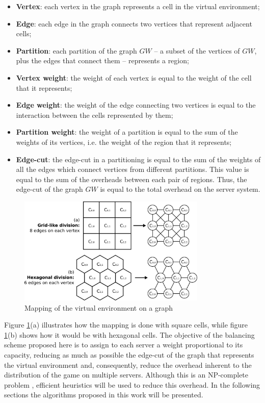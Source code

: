 \begin{itemize}
	\item \textbf{Vertex}: each vertex in the graph represents a cell in the virtual environment;
	\item \textbf{Edge}: each edge in the graph connects two vertices that represent adjacent cells;
	\item \textbf{Partition}: each partition of the graph $GW$ -- a subset of the vertices of $GW$, plus the edges that connect them -- represents a region;
	\item \textbf{Vertex weight}: the weight of each vertex is equal to the weight of the cell that it represents;
	\item \textbf{Edge weight}: the weight of the edge connecting two vertices is equal to the interaction between the cells represented by them;
	\item \textbf{Partition weight}: the weight of a partition is equal to the sum of the weights of its vertices, i.e. the weight of the region that it represents;
	\item \textbf{Edge-cut}: the edge-cut in a partitioning is equal to the sum of the weights of all the edges which connect vertices from different partitions. This value is equal to the sum of the overheads between each pair of regions. Thus, the edge-cut of the graph $GW$ is equal to the total overhead on the server system.
\end{itemize}

\begin{figure}
\centering
\includegraphics[width=0.8\textwidth]{images/mapping}
\caption{Mapping of the virtual environment on a graph}
\label{fig:mapping}
\end{figure}

Figure \ref{fig:mapping}(a) illustrates how the mapping is done with square cells, while figure \ref{fig:mapping}(b) shows how it would be with hexagonal cells. The objective of the balancing scheme proposed here is to assign to each server a weight proportional to its capacity, reducing as much as possible the edge-cut of the graph that represents the virtual environment and, consequently, reduce the overhead inherent to the distribution of the game on multiple servers. Although this is an NP-complete problem \cite{feder1999cgp}, efficient heuristics will be used to reduce this overhead. In the following sections the algorithms proposed in this work will be presented.

